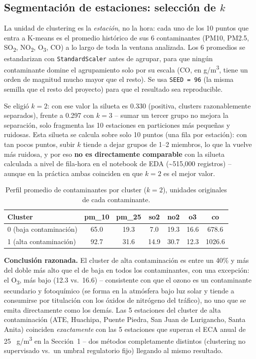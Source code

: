 \documentclass[11pt,a4paper]{article}
\begin{document}
\subsection{Segmentación de estaciones: selección de $k$}
\label{sec:clustering-just}

La unidad de clustering es la \emph{estación}, no la hora: cada uno de los 10 puntos
que entra a K-means es el promedio histórico de sus 6 contaminantes (PM10, PM2.5,
SO\textsubscript{2}, NO\textsubscript{2}, O\textsubscript{3}, CO) a lo largo de toda
la ventana analizada. Los 6 promedios se estandarizan con \texttt{StandardScaler}
antes de agrupar, para que ningún contaminante domine el agrupamiento solo por su
escala (CO, en \textmu g/m\textsuperscript{3}, tiene un orden de magnitud mucho mayor
que el resto). Se usa \texttt{SEED = 96} (la misma semilla que el resto del proyecto)
para que el resultado sea reproducible.

Se eligió $k=2$: con ese valor la silueta es 0.330 (positiva, clusters razonablemente
separados), frente a 0.297 con $k=3$ -- sumar un tercer grupo no mejora la separación,
solo fragmenta las 10 estaciones en particiones más pequeñas y ruidosas. Esta silueta
se calcula sobre solo 10 puntos (una fila por estación): con tan pocos puntos, subir
$k$ tiende a dejar grupos de 1--2 miembros, lo que la vuelve más ruidosa, y por eso
\textbf{no es directamente comparable} con la silueta calculada a nivel de fila-hora
en el notebook de EDA (\textasciitilde 515{,}000 registros) -- aunque en la práctica
ambas coinciden en que $k=2$ es el mejor valor.

\begin{table}[h!]
\centering
\small
\begin{tabular}{@{}lcccccc@{}}
\toprule
\textbf{Cluster} & \textbf{pm\_10} & \textbf{pm\_25} & \textbf{so2} & \textbf{no2} & \textbf{o3} & \textbf{co} \\
\midrule
0 (baja contaminación) & 65.0 & 19.3 & 7.0 & 19.3 & 16.6 & 678.6 \\
1 (alta contaminación) & 92.7 & 31.6 & 14.9 & 30.7 & 12.3 & 1026.6 \\
\bottomrule
\end{tabular}
\caption{Perfil promedio de contaminantes por cluster ($k=2$), unidades originales de cada contaminante.}
\label{tab:cluster-profile}
\end{table}

\textbf{Conclusión razonada.} El cluster de alta contaminación es entre un 40\% y
más del doble más alto que el de baja en todos los contaminantes, con una excepción:
el O\textsubscript{3}, más bajo (12.3 vs.\ 16.6) -- consistente con que el ozono es un
contaminante secundario y fotoquímico (se forma en la atmósfera bajo luz solar y tiende
a consumirse por titulación con los óxidos de nitrógeno del tráfico), no uno que se
emita directamente como los demás. Las 5 estaciones del cluster de alta contaminación
(ATE, Huachipa, Puente Piedra, San Juan de Lurigancho, Santa Anita) coinciden
\emph{exactamente} con las 5 estaciones que superan el ECA anual de 25~\textmu
g/m\textsuperscript{3} en la Sección~1 -- dos métodos completamente distintos
(clustering no supervisado vs.\ un umbral regulatorio fijo) llegando al mismo
resultado.
\end{document}
